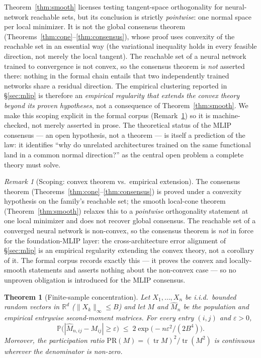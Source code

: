 \documentclass[11pt]{article}
\newtheorem{theorem}{Theorem}
\theoremstyle{remark}
\newtheorem{remark}{Remark}
\begin{document}
Theorem~\ref{thm:smooth} licenses testing tangent-space orthogonality for
neural-network reachable sets, but its conclusion is strictly \emph{pointwise}:
one normal space per local minimizer. It is not the global consensus theorem
(Theorems~\ref{thm:cone}--\ref{thm:consensus}), whose proof uses convexity of the
reachable set in an essential way (the variational inequality holds in every
feasible direction, not merely the local tangent). The reachable set of a neural
network trained to convergence is not convex, so the consensus theorem is
\emph{not} asserted there: nothing in the formal chain entails that two
independently trained networks share a residual direction. The empirical
clustering reported in \S\ref{sec:mlip} is therefore an \emph{empirical
regularity that extends the convex theory beyond its proven hypotheses}, not a
consequence of Theorem~\ref{thm:smooth}. We make this scoping explicit in the
formal corpus (Remark~\ref{rem:empirical}) so it is machine-checked, not merely
asserted in prose. The theoretical status of the MLIP consensus --- an open
hypothesis, not a theorem --- is itself a prediction of the law: it identifies
``why do unrelated architectures trained on the same functional land in a common
normal direction?'' as the central open problem a complete theory must solve.

\begin{remark}[Scoping: convex theorem vs.\ empirical extension]\label{rem:empirical}
The consensus theorem (Theorems~\ref{thm:cone}--\ref{thm:consensus}) is proved
under a convexity hypothesis on the family's reachable set; the smooth
local-cone theorem (Theorem~\ref{thm:smooth}) relaxes this to a \emph{pointwise}
orthogonality statement at one local minimizer and does not recover global
consensus. The reachable set of a converged neural network is non-convex, so the
consensus theorem is \emph{not} in force for the foundation-MLIP layer: the
cross-architecture error alignment of \S\ref{sec:mlip} is an empirical
regularity extending the convex theory, not a corollary of it. The formal corpus
records exactly this --- it proves the convex and locally-smooth statements and
asserts nothing about the non-convex case --- so no unproven obligation is
introduced for the MLIP consensus.
\end{remark}

\begin{theorem}[Finite-sample concentration]\label{thm:concentration}
Let $X_1, \dots, X_n$ be i.i.d.\ bounded random vectors in $\mathbb{R}^d$
($\|X_k\|_\infty \le B$) and let $M$ and $\widehat M_n$ be the population and
empirical entrywise second-moment matrices. For every entry $(i,j)$ and
$\varepsilon > 0$,
\[
\mathbb{P}\bigl(|\widehat M_{n,ij} - M_{ij}| \ge \varepsilon\bigr)
\;\le\; 2 \exp\!\bigl(-n\varepsilon^2 / (2B^4)\bigr).
\]
Moreover, the participation ratio
$\mathrm{PR}(M) = (\operatorname{tr} M)^2 / \operatorname{tr}(M^2)$ is
continuous wherever the denominator is non-zero.
\end{theorem}
\end{document}
